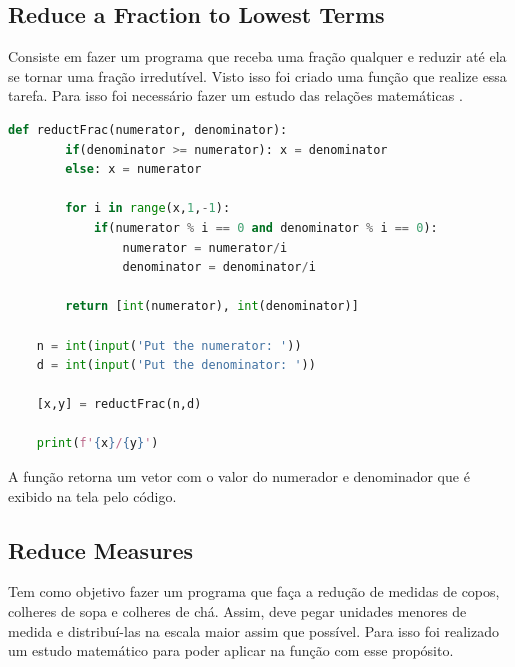 \subsection{Reduce a Fraction to Lowest Terms}

Consiste em fazer um programa que receba uma fração qualquer e reduzir até ela se tornar uma fração irredutível. Visto isso foi criado uma função que realize essa tarefa. Para isso foi necessário fazer um estudo das relações matemáticas \cite{Simplifi10:online}.

\begin{lstlisting}[language=python]
    def reductFrac(numerator, denominator):
        if(denominator >= numerator): x = denominator
        else: x = numerator

        for i in range(x,1,-1):
            if(numerator % i == 0 and denominator % i == 0):
                numerator = numerator/i
                denominator = denominator/i
        
        return [int(numerator), int(denominator)]

    n = int(input('Put the numerator: '))
    d = int(input('Put the denominator: '))

    [x,y] = reductFrac(n,d)

    print(f'{x}/{y}')
\end{lstlisting}

A função retorna um vetor com o valor do numerador e denominador que é exibido na tela pelo código.



\subsection{Reduce Measures}

Tem como objetivo fazer um programa que faça a redução de medidas de copos, colheres de sopa e colheres de chá. Assim, deve pegar unidades menores de medida e distribuí-las na escala maior assim que possível. Para isso foi realizado um estudo matemático para poder aplicar na função com esse propósito. 

